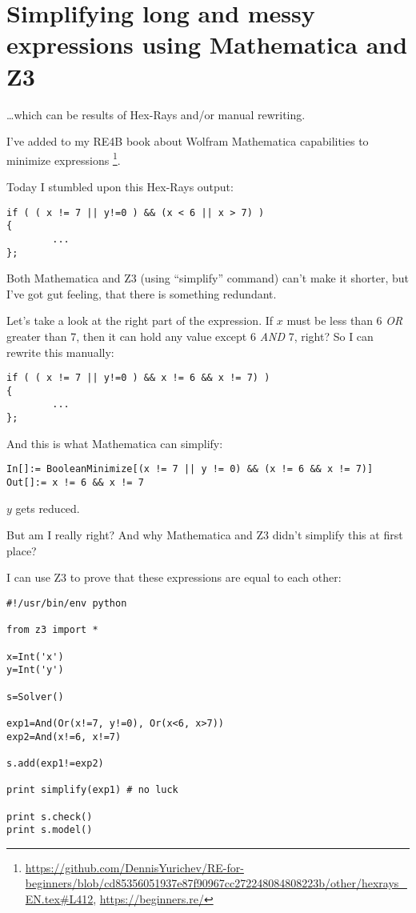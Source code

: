 \section{Simplifying long and messy expressions using Mathematica and Z3}

\dots which can be results of Hex-Rays and/or manual rewriting.

I've added to my RE4B book about Wolfram Mathematica capabilities to minimize expressions
\footnote{\url{https://github.com/DennisYurichev/RE-for-beginners/blob/cd85356051937e87f90967cc272248084808223b/other/hexrays_EN.tex\#L412}, \url{https://beginners.re/}}.

Today I stumbled upon this Hex-Rays output:

\begin{lstlisting}
if ( ( x != 7 || y!=0 ) && (x < 6 || x > 7) )
{
        ...
};
\end{lstlisting}

Both Mathematica and Z3 (using ``simplify'' command) can't make it shorter, but I've got gut feeling,
that there is something redundant.

Let's take a look at the right part of the expression.
If $x$ must be less than 6 \textit{OR} greater than 7, then it can hold any value except 6 \textit{AND} 7, right?
So I can rewrite this manually:

\begin{lstlisting}
if ( ( x != 7 || y!=0 ) && x != 6 && x != 7) )
{
        ...
};
\end{lstlisting}

And this is what Mathematica can simplify:

\begin{lstlisting}
In[]:= BooleanMinimize[(x != 7 || y != 0) && (x != 6 && x != 7)]
Out[]:= x != 6 && x != 7
\end{lstlisting}

$y$ gets reduced.

But am I really right?
And why Mathematica and Z3 didn't simplify this at first place?

I can use Z3 to prove that these expressions are equal to each other:

\begin{lstlisting}
#!/usr/bin/env python

from z3 import *

x=Int('x')
y=Int('y')

s=Solver()

exp1=And(Or(x!=7, y!=0), Or(x<6, x>7))
exp2=And(x!=6, x!=7)

s.add(exp1!=exp2)

print simplify(exp1) # no luck

print s.check()
print s.model()
\end{lstlisting}

